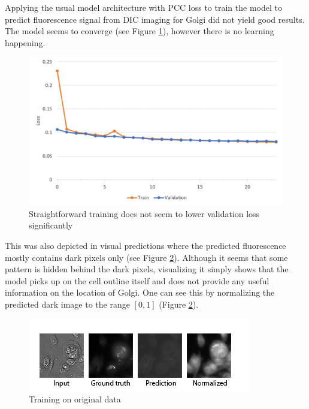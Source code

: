 Applying the usual model architecture with PCC loss to train the model to predict fluorescence signal from DIC imaging for Golgi did not yield good results. The model seems to converge (see Figure \ref{fig:golgi-no-reg-pcc}), however there is no learning happening.
\begin{figure}[H]
	\begin{center}
		\includegraphics[width=0.5\linewidth]{bilder/golgi/pcc-no-reg.jpg}
		\caption{Straightforward training does not seem to lower validation loss significantly}\label{fig:golgi-no-reg-pcc}
	\end{center}
\end{figure}

This was also depicted in visual predictions where the predicted fluorescence mostly contains dark pixels only (see Figure \ref{fig:golgi-no-reg-pcc-predictions}). Although it seems that some pattern is hidden behind the dark pixels, visualizing it simply shows that the model picks up on the cell outline itself and does not provide any useful information on the location of Golgi. One can see this by normalizing the predicted dark image to the range $[0,1]$ (Figure \ref{fig:golgi-no-reg-pcc-predictions}).
\begin{figure}[htb]
	\begin{center}
		\includegraphics[width=0.8\linewidth]{bilder/golgi/too-dark.png}
		\caption{Training on original data}\label{fig:golgi-no-reg-pcc-predictions}
	\end{center}
\end{figure}

